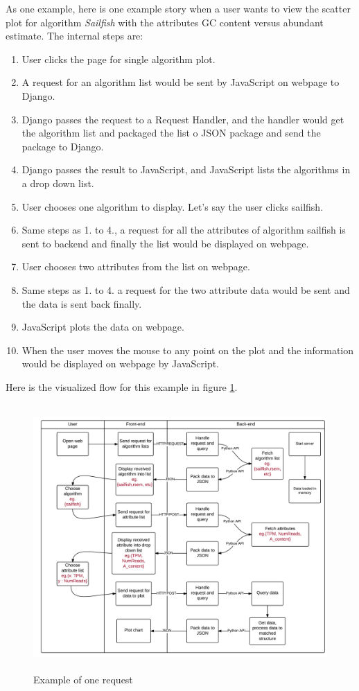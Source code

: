 \documentclass[11pt,letter]{article}
\begin{document}
As one example, here is one example story when a user wants to view the scatter plot for algorithm \emph{Sailfish} with the attributes GC content versus abundant estimate. The internal steps are:
\begin{enumerate}
\item User clicks the page for single algorithm plot.
\item A request for an algorithm list would be sent by JavaScript on webpage to Django.
\item Django passes the request to a Request Handler, and the handler would get the algorithm list and packaged the list o JSON package and send the package to Django.
\item Django passes the result to JavaScript, and JavaScript lists the algorithms in a drop down list.
\item User chooses one algorithm to display. Let's say the user clicks sailfish.
\item Same steps as 1. to 4., a request for all the attributes of algorithm sailfish is sent to backend and finally the list would be displayed on webpage.
\item User chooses two attributes from the list on webpage.
\item Same steps as 1. to 4. a request for the two attribute data would be sent and the data is sent back finally.
\item JavaScript plots the data on webpage.
\item When the user moves the mouse to any point on the plot and the information would be displayed on webpage by JavaScript.
\end{enumerate}

Here is the visualized flow for this example in figure \ref{fig:story}.
\begin{figure}[h!]
\centering
\includegraphics[height=4in, width=5in]{./fig/story.png}
\caption{Example of one request}
\label{fig:story}
\end{figure}
\end{document}
